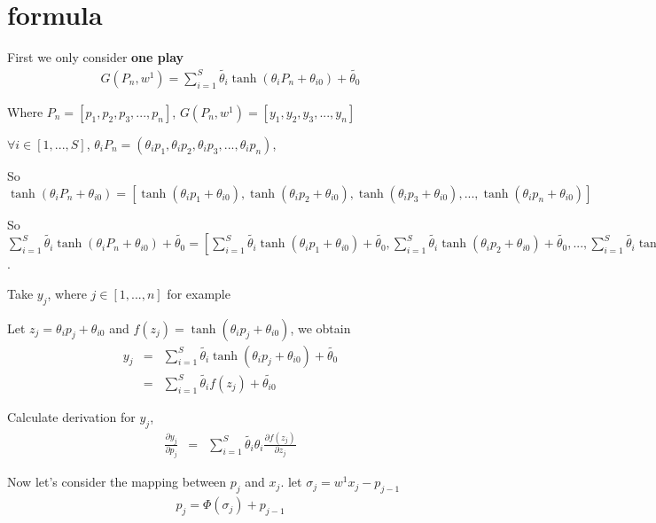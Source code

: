 \documentclass[11pt]{article}
\date{\today}
\title{}
\begin{document}
\tableofcontents

\section{formula}
\label{sec:org33f038c}
First we only consider \textbf{one play}
\begin{eqnarray}
G(P_{n}, w^{1}) = \sum_{i=1}^{S} \tilde{\theta_{i}} \tanh(\theta_{i} P_{n} + \theta_{i0}) + \tilde{\theta_{0}}
\end{eqnarray}

Where \(P_{n} = [p_{1}, p_{2}, p_{3}, ..., p_{n}]\), \(G(P_{n}, w^{1}) = [y_{1}, y_{2}, y_{3}, ..., y_{n}]\)

\(\forall{i} \in [1, ..., S]\), \(\theta_{i} P_{n} = (\theta_{i} p_{1}, \theta_{i} p_{2}, \theta_{i} p_{3}, ..., \theta_{i} p_{n})\),

So
\(\tanh(\theta_{i} P_{n} + \theta_{i0}) =
[\tanh(\theta_{i} p_{1} + \theta_{i0}),
\tanh(\theta_{i} p_{2} + \theta_{i0}),
\tanh(\theta_{i} p_{3} + \theta_{i0}),
...,
\tanh(\theta_{i} p_{n} + \theta_{i0})]\)

So \(\sum_{i=1}^{S} \tilde{\theta_{i}} \tanh(\theta_{i} P_{n} + \theta_{i0}) + \tilde{\theta_{0}} =
[\sum_{i=1}^{S} \tilde{\theta_{i}} \tanh(\theta_{i} p_{1} + \theta_{i0}) + \tilde{\theta_{0}},
\sum_{i=1}^{S} \tilde{\theta_{i}} \tanh(\theta_{i} p_{2} + \theta_{i0}) + \tilde{\theta_{0}},
...,
\sum_{i=1}^{S} \tilde{\theta_{i}} \tanh(\theta_{i} p_{n} + \theta_{i0}) + \tilde{\theta_{0}}] =
[y_{1}, y_{2}, ..., y_{n}]\).

Take \(y_{j}\), where \(j \in [1, ..., n]\) for example

Let \(z_j=\theta_i p_j + \theta_{i0}\) and \(f(z_j) = \tanh(\theta_i p_j + \theta_{i0})\), we obtain
\begin{eqnarray}
y_{j}  &=& \sum_{i=1}^{S} \tilde{\theta_{i}} \tanh(\theta_{i} p_{j} + \theta_{i0}) + \tilde{\theta_{0}}  \\
       &=& \sum_{i=1}^{S} \tilde{\theta_{i}} f(z_j) + \tilde{\theta_{i0}}
\end{eqnarray}

Calculate derivation for \(y_{j}\),
\begin{eqnarray}
\frac{\partial y_{j}}{\partial p_{j}} &=& \sum_{i=1}^{S} \tilde{\theta_{i}} \theta_{i} \frac{\partial f(z_j)}{\partial z_{j}}
\end{eqnarray}

Now let's consider the mapping between \(p_{j}\) and \(x_{j}\). let \(\sigma_{j} = w^{1} x_{j} - p_{j-1}\)
\begin{eqnarray}
p_{j} = \Phi(\sigma_{j}) + p_{j-1}
\end{eqnarray}
\end{document}
